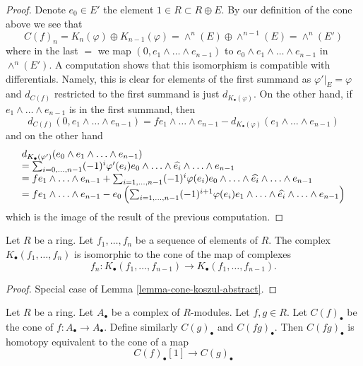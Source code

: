 \begin{proof}
Denote $e_0 \in E'$ the element $1 \in R \subset R \oplus E$.
By our definition of the cone above we see that
$$
C(f)_n = K_n(\varphi) \oplus K_{n - 1}(\varphi) =
\wedge^n(E) \oplus \wedge^{n - 1}(E) = \wedge^n(E')
$$
where in the last $=$ we map $(0, e_1 \wedge \ldots \wedge e_{n - 1})$
to $e_0 \wedge e_1 \wedge \ldots \wedge e_{n - 1}$ in $\wedge^n(E')$.
A computation shows that this isomorphism is compatible with
differentials. Namely, this is clear for elements of the first
summand as $\varphi'|_E = \varphi$ and $d_{C(f)}$ restricted to
the first summand is just $d_{K_\bullet(\varphi)}$.
On the other hand, if $e_1 \wedge \ldots \wedge e_{n - 1}$
is in the first summand, then
$$
d_{C(f)}(0, e_1 \wedge \ldots \wedge e_{n - 1}) =
fe_1 \wedge \ldots \wedge e_{n - 1}
- d_{K_\bullet(\varphi)}(e_1 \wedge \ldots \wedge e_{n - 1})
$$
and on the other hand
$$
\begin{matrix}
d_{K_\bullet(\varphi')}(e_0 \wedge e_1 \wedge \ldots \wedge e_{n - 1})
\hfill \\
= \sum\nolimits_{i = 0, \ldots, n - 1}
(-1)^i \varphi'(e_i)e_0 \wedge \ldots \wedge \widehat{e_i}
\wedge \ldots \wedge e_{n - 1} \hfill \\
= fe_1 \wedge \ldots \wedge e_{n - 1} +
\sum\nolimits_{i = 1, \ldots, n - 1}
(-1)^i \varphi(e_i)e_0 \wedge \ldots \wedge \widehat{e_i}
\wedge \ldots \wedge e_{n - 1} \hfill \\
= fe_1 \wedge \ldots \wedge e_{n - 1} -
e_0 \left(\sum\nolimits_{i = 1, \ldots, n - 1}
(-1)^{i + 1} \varphi(e_i)e_1 \wedge \ldots \wedge \widehat{e_i}
\wedge \ldots \wedge e_{n - 1}\right)
\end{matrix}
$$
which is the image of the result of the previous computation.
\end{proof}

\begin{lemma}
\label{lemma-cone-koszul}
Let $R$ be a ring. Let $f_1, \ldots, f_n$ be a sequence of elements
of $R$. The complex $K_\bullet(f_1, \ldots, f_n)$ is isomorphic to the
cone of the map of complexes
$$
f_n :
K_\bullet(f_1, \ldots, f_{n - 1})
\longrightarrow
K_\bullet(f_1, \ldots, f_{n - 1}).
$$
\end{lemma}

\begin{proof}
Special case of
Lemma \ref{lemma-cone-koszul-abstract}.
\end{proof}

\begin{lemma}
\label{lemma-cone-squared}
Let $R$ be a ring. Let $A_\bullet$ be a complex of $R$-modules.
Let $f, g \in R$. Let $C(f)_\bullet$ be the cone of
$f : A_\bullet \to A_\bullet$. Define similarly $C(g)_\bullet$ and
$C(fg)_\bullet$. Then $C(fg)_\bullet$ is homotopy equivalent to the
cone of a map
$$
C(f)_\bullet[1] \longrightarrow C(g)_\bullet
$$
\end{lemma}

